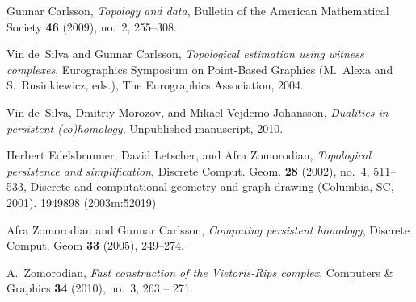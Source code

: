 \documentclass{gts2012}
\begin{document}
\begin{thebibliography}{99}

Gunnar Carlsson, \emph{{Topology and data}}, Bulletin of the American
  Mathematical Society \textbf{46} (2009), no.~2, 255--308.

Vin de~Silva and Gunnar Carlsson, \emph{{Topological estimation using witness
  complexes}}, Eurographics Symposium on Point-Based Graphics (M.~Alexa and
  S.~Rusinkiewicz, eds.), The Eurographics Association, 2004.

Vin de~Silva, Dmitriy Morozov, and Mikael Vejdemo-Johansson, \emph{{Dualities
  in persistent (co)homology}}, Unpublished manuscript, 2010.

Herbert Edelsbrunner, David Letscher, and Afra Zomorodian, \emph{Topological
  persistence and simplification}, Discrete Comput. Geom. \textbf{28} (2002),
  no.~4, 511--533, Discrete and computational geometry and graph drawing
  (Columbia, SC, 2001). {1949898 (2003m:52019)}

Afra Zomorodian and Gunnar Carlsson, \emph{Computing persistent homology},
  Discrete Comput. Geom \textbf{33} (2005), 249--274.

A.~Zomorodian, \emph{Fast construction of the {V}ietoris-{R}ips complex},
  Computers \& Graphics \textbf{34} (2010), no.~3, 263 -- 271.


\end{thebibliography}
\end{document}
